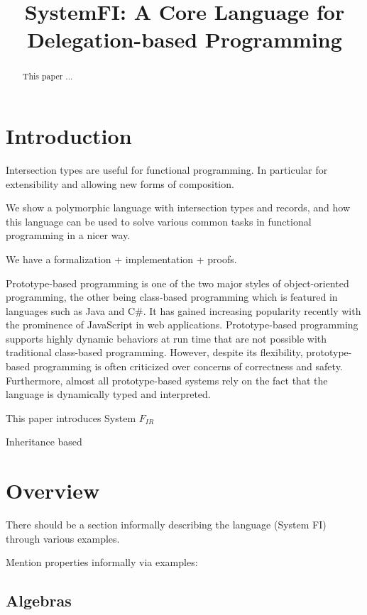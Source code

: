 \documentclass[twocolumn]{article}
\begin{document}
\title{SystemFI: A Core Language for Delegation-based Programming}
\maketitle

\begin{abstract}
  This paper ...
\end{abstract}

\section{Introduction}

Intersection types are useful for functional programming. In particular for 
extensibility and allowing new forms of composition. 

We show a polymorphic language with intersection types and records, and 
how this language can be used to solve various common tasks in functional
programming in a nicer way.

We have a formalization + implementation + proofs.  

Prototype-based programming is one of the two major styles of object-oriented programming, the other being class-based programming which is featured in languages such as Java and C\#.
It has gained
increasing popularity recently with the prominence of JavaScript in
web applications. Prototype-based programming supports highly dynamic
behaviors at run time that are not possible with traditional
class-based programming. However, despite its flexibility,
prototype-based programming is often criticized over concerns of
correctness and safety. Furthermore, almost all prototype-based
systems rely on the fact that the language is dynamically typed and
interpreted.


This paper introduces System $F_{IR}$

Inheritance based

\section{Overview}

There should be a section informally describing the language (System FI) 
through various examples.

Mention properties informally via examples:


\subsection{Algebras}
\end{document}
